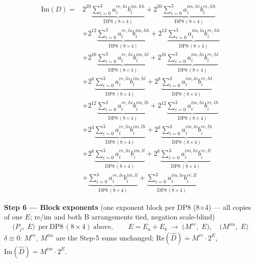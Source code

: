 \documentclass[fleqn]{article}
\newcommand{\DPop}[3]{\mathrm{DP#1}\,(#2\!\times\!#3)}
\begin{document}
\begin{align*}
\mathrm{Im}(D) = {}
  & 2^{20}\underbrace{\sum_{i=0}^{3} a_i^{re,hi} b_i^{im,hh}}_{\DPop{8}{8}{4}} + 2^{20}\underbrace{\sum_{i=0}^{3} a_i^{im,hi} b_i^{re,hh}}_{\DPop{8}{8}{4}} \\[0.5em]
  & + 2^{12}\underbrace{\sum_{i=0}^{3} a_i^{re,lo} b_i^{im,hh}}_{\DPop{8}{8}{4}} + 2^{12}\underbrace{\sum_{i=0}^{3} a_i^{im,lo} b_i^{re,hh}}_{\DPop{8}{8}{4}} \\[0.5em]
  & + 2^{16}\underbrace{\sum_{i=0}^{3} a_i^{re,hi} b_i^{im,hl}}_{\DPop{8}{8}{4}} + 2^{16}\underbrace{\sum_{i=0}^{3} a_i^{im,hi} b_i^{re,hl}}_{\DPop{8}{8}{4}} \\[0.5em]
  & + 2^{8}\underbrace{\sum_{i=0}^{3} a_i^{re,lo} b_i^{im,hl}}_{\DPop{8}{8}{4}} + 2^{8}\underbrace{\sum_{i=0}^{3} a_i^{im,lo} b_i^{re,hl}}_{\DPop{8}{8}{4}} \\[0.5em]
  & + 2^{12}\underbrace{\sum_{i=0}^{3} a_i^{re,hi} b_i^{im,lh}}_{\DPop{8}{8}{4}} + 2^{12}\underbrace{\sum_{i=0}^{3} a_i^{im,hi} b_i^{re,lh}}_{\DPop{8}{8}{4}} \\[0.5em]
  & + 2^{4}\underbrace{\sum_{i=0}^{3} a_i^{re,lo} b_i^{im,lh}}_{\DPop{8}{8}{4}} + 2^{4}\underbrace{\sum_{i=0}^{3} a_i^{im,lo} b_i^{re,lh}}_{\DPop{8}{8}{4}} \\[0.5em]
  & + 2^{8}\underbrace{\sum_{i=0}^{3} a_i^{re,hi} b_i^{im,ll}}_{\DPop{8}{8}{4}} + 2^{8}\underbrace{\sum_{i=0}^{3} a_i^{im,hi} b_i^{re,ll}}_{\DPop{8}{8}{4}} \\[0.5em]
  & + \underbrace{\sum_{i=0}^{3} a_i^{re,lo} b_i^{im,ll}}_{\DPop{8}{8}{4}} + \underbrace{\sum_{i=0}^{3} a_i^{im,lo} b_i^{re,ll}}_{\DPop{8}{8}{4}}
\end{align*}

\textbf{Step 6 --- Block exponents}\quad
{\small(one exponent block per DP8 (8$\times$4) --- all copies of one $E$; re/im and both B arrangements tied, negation scale-blind)}
\[
\big(P_j,\; E\big)\ \ \text{per}\ \DPop{8}{8}{4}\ \text{above}, \qquad E = E_a + E_b
\;\longrightarrow\;
\big(M^{re},\; E\big), \quad \big(M^{im},\; E\big)
\]
$\delta\equiv0$: $M^{re}$, $M^{im}$ are the Step-5 sums unchanged; \quad $\mathrm{Re}(\hat D)=M^{re}\cdot2^{E}$, \ $\mathrm{Im}(\hat D)=M^{im}\cdot2^{E}$.
\end{document}
